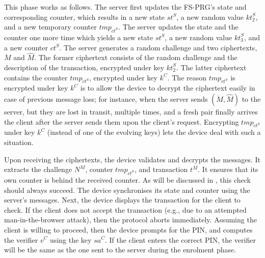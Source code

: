 \documentclass[runningheads]{llncs}
\newcommand{\sss}{\scriptscriptstyle}
\newcommand{\nonce}{\ensuremath{{N}}}
\newcommand{\keyt}{\ensuremath{{kt}}}
\newcommand{\counter}{\ensuremath{{ct}}}
\newcommand{\pin}{\ensuremath{\mathsf{PIN}}}
\newcommand{\salt}{\ensuremath{{sa}}}
\newcommand{\trans}{\ensuremath{{t}}}
\renewcommand{\verifier}{\ensuremath{{v}}}
\renewcommand{\state}{\ensuremath{{st}}}
\newcommand{\VC}[1]{\ensuremath{#1^{\sss C}}}
\newcommand{\VS}[1]{\ensuremath{#1^{\sss S}}}
\newcommand{\VM}[1]{\ensuremath{#1^{\sss M}}}
\newcommand{\tmp}{\ensuremath{{tmp}}}
\begin{document}




This phase works as follows. The server first updates the FS-PRG's state and corresponding counter, which results in a new state \VS{\state}, a new random value  \VS{\keyt_{\sss 2}}, and a new temporary counter $\tmp_{\VS{\counter}}$. The server updates the state and the counter one more time which yields a new state \VS{\state}, a new random value \VS{\keyt_{\sss 3}}, and a new counter \VS{\counter}. The server generates a random challenge and two ciphertexts, $\ddot M$ and $\hat M$. The former ciphertext consists of the random challenge and the description of the transaction, encrypted under key \VS{\keyt_{\sss 2}}. The latter ciphertext contains the counter $\tmp_{\VS{\counter}}$, encrypted under key $\VC{k}$. The reason $\tmp_{\VS{\counter}}$ is encrypted under key $\VC{k}$ is to allow the device to decrypt the ciphertext easily 
in case of previous message loss; for instance, when the server sends $(\ddot M, \hat M)$ to the server, but they are lost in transit, multiple times, and a fresh pair finally arrives the client after the server sends them upon the client's request. Encrypting $\tmp_{\VS{\counter}}$ under key $\VC{k}$ (instead of one of the evolving keys) lets the device deal with such a situation. 




Upon receiving the ciphertexts, the device validates and decrypts the messages. It extracts the challenge \VM{\nonce}, counter $\tmp_{\VS{\counter}}$, and transaction \VM{\trans}. It ensures that its own counter is behind the received counter. As will be discussed in , this check should always succeed. The device synchronises its state and counter using the server's messages. Next, the device displays the transaction for the client to check. If the client does not accept the transaction (e.g., due to an attempted man-in-the-browser attack), then the protocol aborts immediately. Assuming the client is willing to proceed, then the device prompts for the PIN, and computes the verifier \VC{\verifier} using the key \VC{\salt}. If the client enters the correct PIN, the verifier will be the same as the one sent to the server during the enrolment phase.
\end{document}
